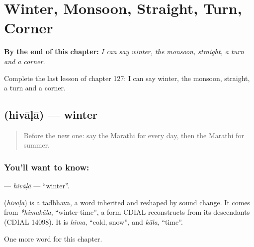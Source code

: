 
\chapter{Winter, Monsoon, Straight, Turn, Corner}
\label{ch:mr-winter-monsoon-straight-turn-corner}

\begin{chapteropening}
\textbf{By the end of this chapter:} \emph{I can say winter, the monsoon, straight, a turn and a corner.}

Complete the last lesson of chapter 127: I can say winter, the monsoon, straight, a turn and a corner.
\end{chapteropening}

\section[\texorpdfstring{\mr{हिवाळा} (hivāḷā)}{हिवाळा (hivāḷā)}]{ (hivāḷā) — winter}

\label{lesson:MR-C127-hivala}



\begin{quote}
Before the new one: say the Marathi for every day, then the Marathi for summer.
\end{quote}

\subsection*{You'll want to know: }
\textbf{} — \emph{hivāḷā} — \textquotedblleft{}winter\textquotedblright{}.

\begin{cousinweb}
\textbf{} (\emph{hivāḷā}) is a tadbhava, a word inherited and reshaped by sound change. It comes from \emph{*himakāla}, \textquotedblleft{}winter-time\textquotedblright{}, a form CDIAL reconstructs from its descendants (CDIAL 14098). It is \emph{hima}, \textquotedblleft{}cold, snow\textquotedblright{}, and \emph{kāla}, \textquotedblleft{}time\textquotedblright{}.
\end{cousinweb}

\begin{grammarlens}[title={What you've built}]
One more word for this chapter.
\end{grammarlens}

